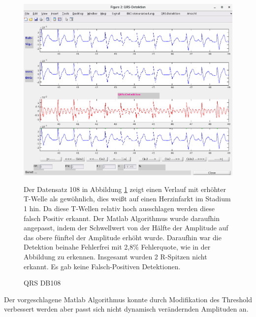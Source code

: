 \documentclass[a4paper,12pt,titlepage]{scrartcl}
\begin{document}
\begin{figure}[ht]
    \begin{minipage}[t]{0.5\linewidth}
        \centering
        \includegraphics[width=0.9\linewidth, valign=t]{Assets/LaborBMT-16-35-29.png}
        \caption{QRS DB108}
        \label{qrsdb108}
    \end{minipage}%
    \begin{minipage}[t]{0.5\linewidth}
        Der Datensatz 108 in Abbildung \ref{qrsdb108} zeigt einen Verlauf mit erhöhter T-Welle als gewöhnlich, dies weißt auf einen Herzinfarkt im Stadium 1 hin. Da diese T-Wellen relativ hoch ausschlagen werden diese falsch Positiv erkannt.
        Der Matlab Algorithmus wurde daraufhin angepasst, indem der Schwellwert von der Hälfte der Amplitude auf das obere fünftel der Amplitude erhöht wurde. Daraufhin war die Detektion beinahe Fehlerfrei mit 2,8\% Fehlerquote, wie in der Abbildung zu erkennen. Insgesamt wurden 2 R-Spitzen nicht erkannt. Es gab keine Falsch-Positiven Detektionen.
    \end{minipage}
\end{figure}

\cleardoublepage
Der vorgeschlagene Matlab Algorithmus konnte durch Modifikation des Threshold verbessert werden aber passt sich nicht dynamisch verändernden Amplituden an.
\end{document}
